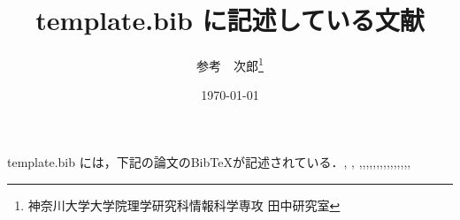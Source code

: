 \documentclass[10pt,twocolumn]{jarticle}
\title{template.bib に記述している文献}
\author{参考　次郎\if0\thanks{神奈川大学大学院理学研究科情報科学専攻 田中研究室}\fi}
\date{\today}
\begin{document}
\maketitle
\thispagestyle{empty}

%
%
%
%
%
%

% 

template.bib には，下記の論文のBibTeXが記述されている．\cite{ABV}, \cite{CrossProducting}, \cite{survey_Taylor_2005},\cite{hicuts19},\cite{rbt},\cite{yuto},\cite{hypercuts},\cite{2014RbtHARADA},\cite{conf/infocom/HamedEA06},\cite{hikin},\cite{hicuts20},\cite{quad-trie},\cite{siftsearch},\cite{Taylor_ClassBench},\cite{takeyama},\cite{sgm},\cite{grouper-conf},\cite{pagiamtzis-jssc:2006}



\end{document}
